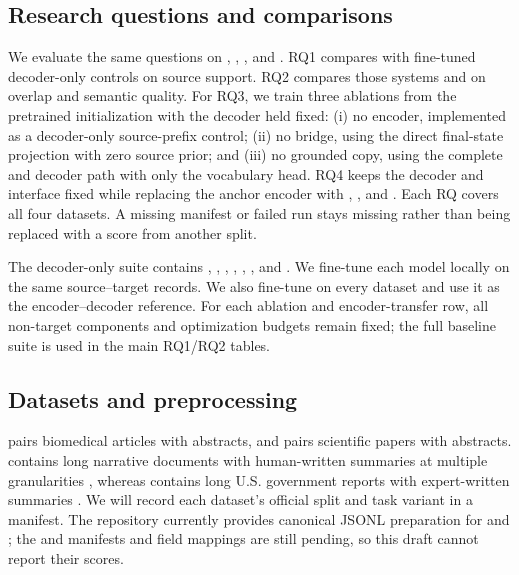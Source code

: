 \subsection{Research questions and comparisons}
\label{sec:rqs}

We evaluate the same questions on \PubMed, \ArXiv, \BookSum, and \GovReport.
RQ1 compares \EviSeq with fine-tuned decoder-only controls on source support.
RQ2 compares those systems and \TfiveGemma on overlap and semantic quality.
For RQ3, we train three ablations from the pretrained initialization with the
decoder held fixed: (i) no encoder, implemented as a decoder-only source-prefix
control; (ii) no \AFMR bridge, using the direct final-state projection with zero
source prior; and (iii) no grounded copy, using the complete \AFMR and decoder
path with only the vocabulary head.  RQ4 keeps the decoder and interface fixed
while replacing the anchor encoder \PPLXEmbed with \QwenCausal, \QwenEmbed,
and \NemotronEmbed.  Each RQ covers all four datasets.  A missing manifest or
failed run stays missing rather than being replaced with a score from another
split.

The decoder-only suite contains \QwenZeroSix, \QwenFour, \QwenEight,
\LlamaThreeTwoThree, \LlamaThreeEight, \NemotronThree, and \NemotronEight.
We fine-tune each model locally on the same source--target records.  We also
fine-tune \TfiveGemma on every dataset and use it as the encoder--decoder
reference.  For each ablation and encoder-transfer row, all non-target
components and optimization budgets remain fixed; the full baseline suite is
used in the main RQ1/RQ2 tables.

\subsection{Datasets and preprocessing}
\label{sec:datasets}

\PubMed pairs biomedical articles with abstracts, and \ArXiv pairs scientific
papers with abstracts.  \BookSum contains long narrative documents with
human-written summaries at multiple granularities \citep{kryscinski2022booksum},
whereas \GovReport contains long U.S. government reports with expert-written
summaries \citep{huang2021efficient}.  We will record each dataset's official
split and task variant in a manifest.  The repository currently provides
canonical JSONL preparation for \PubMed and \ArXiv; the \BookSum and \GovReport
manifests and field mappings are still pending, so this draft cannot report
their scores.

